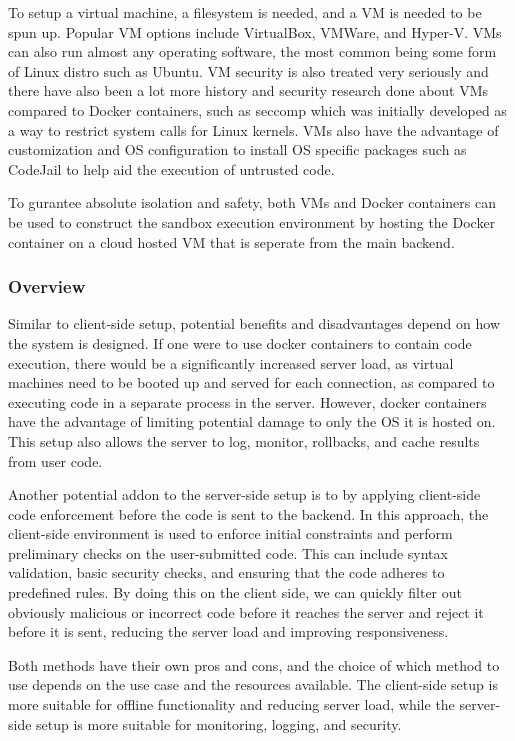 To setup a virtual machine, a filesystem is needed, and a VM is needed to be spun up. Popular VM options include VirtualBox, VMWare, and Hyper-V. VMs can also run almost any operating software, the most common being some form of Linux distro such as Ubuntu. VM security is also treated very seriously and there have also been a lot more history and security research done about VMs compared to Docker containers, such as seccomp which was initially developed as a way to restrict system calls for Linux kernels. VMs also have the advantage of customization and OS configuration to install OS specific packages such as CodeJail to help aid the execution of untrusted code.

To gurantee absolute isolation and safety, both VMs and Docker containers can be used to construct the sandbox execution environment by hosting the Docker container on a cloud hosted VM that is seperate from the main backend.


\subsubsection{Overview}
Similar to client-side setup, potential benefits and disadvantages depend on how the system is designed. If one were to use docker containers to contain code execution, there would be a significantly increased server load, as virtual machines need to be booted up and served for each connection, as compared to executing code in a separate process in the server. However, docker containers have the advantage of limiting potential damage to only the OS it is hosted on. This setup also allows the server to log, monitor, rollbacks, and cache results from user code.

Another potential addon to the server-side setup is to by applying client-side code enforcement before the code is sent to the backend. In this approach, the client-side environment is used to enforce initial constraints and perform preliminary checks on the user-submitted code. This can include syntax validation, basic security checks, and ensuring that the code adheres to predefined rules. By doing this on the client side, we can quickly filter out obviously malicious or incorrect code before it reaches the server and reject it before it is sent, reducing the server load and improving responsiveness.

Both methods have their own pros and cons, and the choice of which method to use depends on the use case and the resources available. The client-side setup is more suitable for offline functionality and reducing server load, while the server-side setup is more suitable for monitoring, logging, and security.
